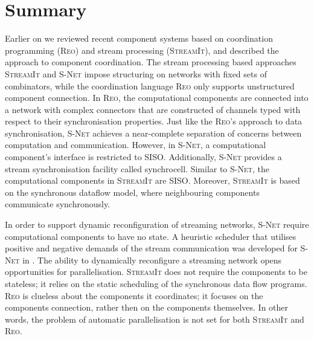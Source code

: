     \section{Summary}
Earlier on we reviewed recent component systems based on coordination programming (\textsc{Reo}) and stream processing (\textsc{StreamIt}), and described the  approach to component coordination. The stream processing based approaches \textsc{StreamIt} and \textsc{S-Net} impose structuring on networks with fixed sets of combinators, while the coordination language \textsc{Reo} only supports unstructured component connection. In \textsc{Reo}, the computational components are connected into a network with complex connectors that are constructed of channels typed with respect to their synchronisation properties. Just like the \textsc{Reo}'s approach to data synchronisation, \textsc{S-Net} achieves a near-complete separation of concerns between computation and communication. However, in \textsc{S-Net}, a computational component's interface is restricted to SISO. Additionally, \textsc{S-Net} provides a stream synchronisation facility called synchrocell. Similar to \textsc{S-Net}, the computational components in \textsc{StreamIt} are SISO. Moreover, \textsc{StreamIt} is based on the synchronous dataflow model, where neighbouring components communicate synchronously.

In order to support dynamic reconfiguration of streaming networks, \textsc{S-Net} require computational components to have no state. A heuristic scheduler that utilises positive and negative demands of the stream communication was developed for \textsc{S-Net} in \cite{nga}. The ability to dynamically reconfigure a streaming network opens opportunities for parallelisation. \textsc{StreamIt} does not require the components to be stateless; it relies on the static scheduling of the synchronous data flow programs. \textsc{Reo} is clueless about the components it coordinates; it focuses on the components connection, rather then on the components themselves. In other words, the problem of automatic parallelisation is not set for both \textsc{StreamIt} and \textsc{Reo}.
%
%



